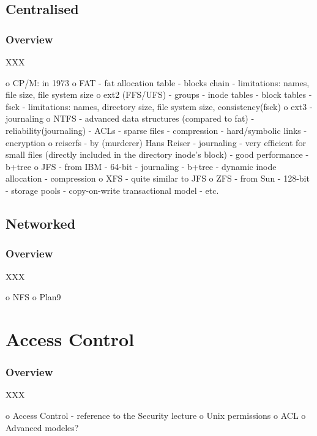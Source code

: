 
\subsection{Centralised}


\begin{frame}
  \frametitle{Overview}

  XXX
\end{frame}

 o CP/M: in 1973
 o FAT
  - fat allocation table
  - blocks chain
  - limitations: names, file size, file system size
 o ext2 (FFS/UFS)
  - groups
  - inode tables
  - block tables
  - fsck
  - limitations: names, directory size, file system size, consistency(fsck)
 o ext3
  - journaling
 o NTFS
  - advanced data structures (compared to fat)
  - reliability(journaling)
  - ACLs
  - sparse files
  - compression
  - hard/symbolic links
  - encryption
 o reiserfs
  - by (murderer) Hans Reiser
  - journaling
  - very efficient for small files (directly included in the directory inode's block)
  - good performance
  - b+tree
 o JFS
  - from IBM
  - 64-bit
  - journaling
  - b+tree
  - dynamic inode allocation
  - compression
 o XFS
  - quite similar to JFS
 o ZFS
  - from Sun
  - 128-bit
  - storage pools
  - copy-on-write transactional model
  - etc.


\subsection{Networked}


\begin{frame}
  \frametitle{Overview}

  XXX
\end{frame}

 o NFS
 o Plan9

%
%

\section{Access Control}


\begin{frame}
  \frametitle{Overview}

  XXX
\end{frame}

o Access Control
 - reference to the Security lecture
 o Unix permissions
 o ACL
 o Advanced modeles?

